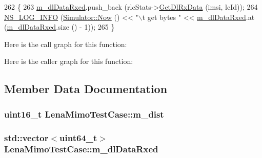 \begin{DoxyCode}
262 \{
263   \hyperlink{classLenaMimoTestCase_a71b10e9b37ba8f45dc307d271fe6bb7f}{m\_dlDataRxed}.push\_back (rlcStats->\hyperlink{classns3_1_1RadioBearerStatsCalculator_a80ec1463cd053d8deebda8498d2b864e}{GetDlRxData} (imsi, lcId));
264   \hyperlink{group__logging_gafbd73ee2cf9f26b319f49086d8e860fb}{NS\_LOG\_INFO} (\hyperlink{group__simulator_gac3635e2e87f7ce316c89290ee1b01d0d}{Simulator::Now} () << \textcolor{stringliteral}{"\(\backslash\)t get bytes "} << 
      \hyperlink{classLenaMimoTestCase_a71b10e9b37ba8f45dc307d271fe6bb7f}{m\_dlDataRxed}.at (\hyperlink{classLenaMimoTestCase_a71b10e9b37ba8f45dc307d271fe6bb7f}{m\_dlDataRxed}.size () - 1));
265 \}
\end{DoxyCode}


Here is the call graph for this function\+:




Here is the caller graph for this function\+:




\subsection{Member Data Documentation}
\subsubsection[{\texorpdfstring{m\+\_\+dist}{m_dist}}]{\setlength{\rightskip}{0pt plus 5cm}uint16\+\_\+t Lena\+Mimo\+Test\+Case\+::m\+\_\+dist\hspace{0.3cm}{\ttfamily [private]}}\hypertarget{classLenaMimoTestCase_ae63d46254a08c9e2b064d6c4855d5a77}{}\label{classLenaMimoTestCase_ae63d46254a08c9e2b064d6c4855d5a77}
\subsubsection[{\texorpdfstring{m\+\_\+dl\+Data\+Rxed}{m_dlDataRxed}}]{\setlength{\rightskip}{0pt plus 5cm}std\+::vector$<$uint64\+\_\+t$>$ Lena\+Mimo\+Test\+Case\+::m\+\_\+dl\+Data\+Rxed\hspace{0.3cm}{\ttfamily [private]}}\hypertarget{classLenaMimoTestCase_a71b10e9b37ba8f45dc307d271fe6bb7f}{}\label{classLenaMimoTestCase_a71b10e9b37ba8f45dc307d271fe6bb7f}
